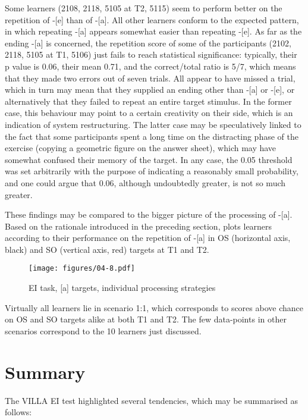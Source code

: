 Some learners (2108, 2118, 5105 at T2, 5115) seem to perform better on the repetition of -[e] than of -[a]. All other learners conform to the expected pattern, in which repeating -[a] appears somewhat easier than repeating -[e]. As far as the ending -[a] is concerned, the repetition score of some of the participants (2102, 2118, 5105 at T1, 5106) just fails to reach statistical significance: typically, their p value  is 0.06, their mean 0.71, and the correct/total ratio is 5/7, which means that they made two errors out of seven trials. All appear to have missed a trial, which in turn may mean that they supplied an ending other than -[a] or -[e], or alternatively that they failed to repeat an entire target stimulus. In the former case, this behaviour may point to a certain creativity on their side, which is an indication of system restructuring. The latter case may be speculatively linked to the fact that some participants spent a long time on the distracting phase of the exercise (copying a geometric figure on the answer sheet), which may have somewhat confused their memory of the target. In any case, the 0.05 threshold was set arbitrarily with the purpose of indicating a reasonably small probability, and one could argue that 0.06, although undoubtedly greater, is not so much greater.

These findings may be compared to the bigger picture of the processing of -[a]. Based on the rationale introduced in the preceding section,  plots learners according to their performance on the repetition of -[a] in OS (horizontal axis, black) and SO (vertical axis, red) targets at T1 and T2.

\begin{figure}
    \texttt{[image: figures/04-8.pdf]}
    \caption{EI task, [a] targets, individual processing strategies}
    \label{fig:04:8}
\end{figure}

Virtually all learners lie in scenario 1:1, which corresponds to scores above chance on OS and SO targets alike at both T1 and T2. The few data-points in other scenarios correspond to the 10 learners just discussed.

\section{Summary}\label{sec:04:3}

The VILLA EI test highlighted several tendencies, which may be summarised as follows:

